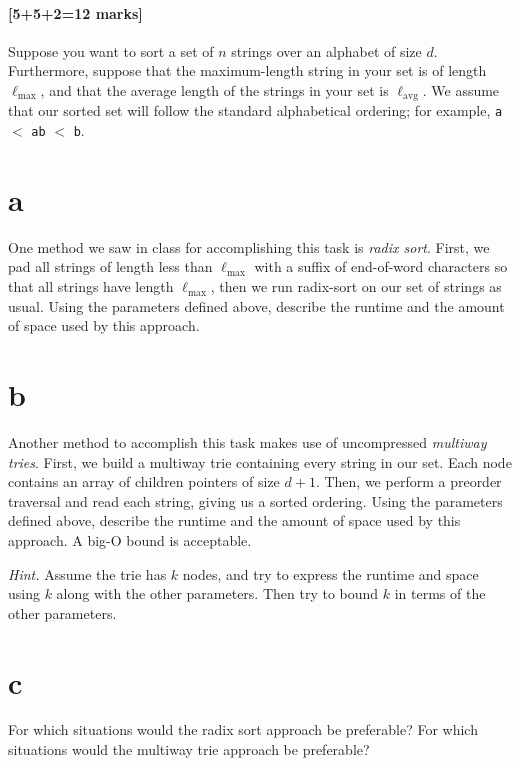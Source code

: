 \documentclass[12pt]{article}
\begin{document}
	
	\subsection{[5+5+2=12 marks]}
	
	Suppose you want to sort a set of $n$ strings over an alphabet of size $d$. 
	Furthermore, suppose that the maximum-length string in your set is of length $\ell_{\text{max}}$, 
	and that the average length of the strings in your set is $\ell_{\text{avg}}$. 
	We assume that our sorted set will follow the standard alphabetical ordering; 
	for example, \texttt{a} $<$ \texttt{ab} $<$ \texttt{b}.
	
	\begin{enumerate}
		\part{a} One method we saw in class for accomplishing this task is \textit{radix sort}. 
		First, we pad all strings of length less than $\ell_{\text{max}}$ with a suffix of end-of-word characters so that
		all strings have length $\ell_{\text{max}}$, then we run radix-sort on our set of strings as usual. 
		Using the parameters defined above, describe the runtime and the amount of space used by this approach.
		
		\part{b} Another method to accomplish this task makes use of uncompressed \textit{multiway tries}. 
		First, we build a multiway trie containing every string in our set. 
		Each node contains an array of children pointers of size $d+1$. 
		Then, we perform a preorder traversal and read each string, giving us a sorted ordering. 
		Using the parameters defined above, describe the runtime and the amount of space used by this approach.
		A big-O bound is acceptable.
		
		\textsl{Hint.} Assume the trie has $k$ nodes, and try to express the runtime and space using $k$ along with the other parameters.  Then try to bound $k$ in terms of the other parameters.
		
		\part{c} For which situations would the radix sort approach be preferable? For which situations would the multiway trie approach be preferable?
		
	\end{enumerate}
	
\end{document}
